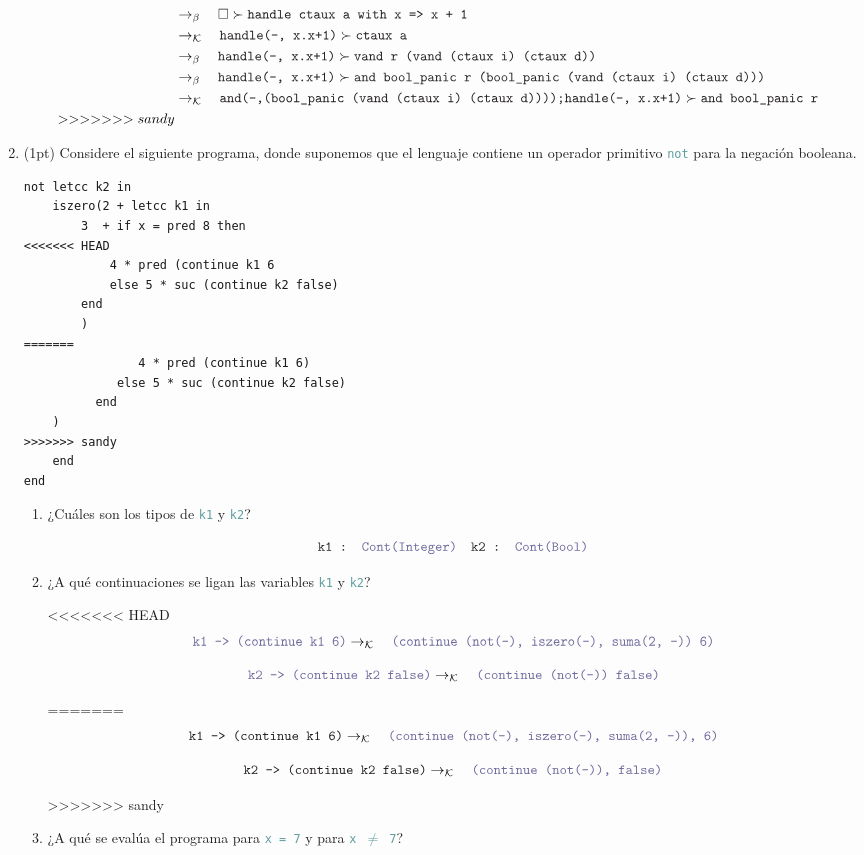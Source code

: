 \documentclass{article}
\newcommand{\tx}[1]{\textcolor{Black} {\texttt{#1}}}
\newcommand{\tp}[1]{\textcolor{CadetBlue} {\texttt{#1}}}
\newcommand{\pt}[1]{\textcolor{RoyalPurple}{(#1pt)}}
\newcommand{\es}{$\square$}
\newcommand{\pop}[2]{ \tx{#1} \succ \tx{#2}}
\newcommand{\kr}{\rightarrow_{\mathcal{K}} \quad}
\newcommand{\br}{\rightarrow_{\beta} \quad}
\begin{document}
\begin{enumerate}
\begin{align*}
        &\br \pop{\es}{handle ctaux a with x => x + 1}\\
        &\kr \pop{handle(-, x.x+1)}{ctaux a}\\
        &\br \pop{handle(-, x.x+1)}{vand r (vand (ctaux i) (ctaux d))}\\
        &\br \pop{handle(-, x.x+1)}{and bool\_panic r (bool\_panic (vand (ctaux i) (ctaux d)))}\\
        &\kr \pop{and(-,(bool\_panic (vand (ctaux i) (ctaux d))));handle(-, x.x+1)}{and bool\_panic r }\\
>>>>>>> sandy
        \end{align*}

        \item \pt{1} Considere el siguiente programa, donde suponemos que el
        lenguaje contiene un operador primitivo \tp{not} para la negación
        booleana.

        \begin{verbatim}
not letcc k2 in
    iszero(2 + letcc k1 in
        3  + if x = pred 8 then
<<<<<<< HEAD
            4 * pred (continue k1 6
            else 5 * suc (continue k2 false)
        end
        )
=======
            	4 * pred (continue k1 6)
             else 5 * suc (continue k2 false)
          end
    )
>>>>>>> sandy
    end
end
        \end{verbatim}
        \begin{enumerate}
            \item ¿Cuáles son los tipos de \tp{k1} y \tp{k2}?

            \[
                \tx{k1 : } \tp{Cont(Integer)} \quad \tx{k2 : } \tp{Cont(Bool)}
            \]

            \item ¿A qué continuaciones se ligan las variables \tp{k1} y \tp{k2}?

<<<<<<< HEAD
            \[
                \tp{k1 --> (continue k1 6)} 
                \kr \tp{(continue (not(-), iszero(-), suma(2, -)) 6)}
            \]

            \[
                \tp{k2 --> (continue k2 false)} 
                \kr \tp{(continue (not(-)) false)}
            \]

=======
			\[
			\tx{k1 --> (continue k1 6)} 
			\kr \tp{(continue (not(-), iszero(-), suma(2, -)), 6)}
			\]
			
			\[
			\tx{k2 --> (continue k2 false)} 
			\kr \tp{(continue (not(-)), false)}
			\]
			
>>>>>>> sandy
            \item ¿A qué se evalúa el programa para \tp{x = 7} y para \tp{x $\neq$ 7}?
     		

\end{enumerate}
\end{enumerate}
\end{document}
